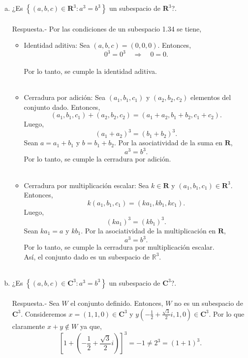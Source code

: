 \begin{enumerate}[\bfseries 1.]
\begin{enumerate}[(a)]
	    \item ¿Es $\left\{(a,b,c) \in \textbf{R}^3 : a^3=b^3 \right\}$ un subespacio de $\textbf{R}^3$?.\\\\
		Respuesta.-\; Por las condiciones de un subespacio 1.34 se tiene,\\
		\begin{itemize}
		    \item Identidad aditiva: Sea $(a,b,c)=(0,0,0)$. Entonces,
			$$0^3=0^3\quad \Rightarrow \quad 0=0.$$\\
			Por lo tanto, se cumple la identidad aditiva.\\\\
		    \item Cerradura por adición: Sea $(a_1,b_1,c_1)$ y $(a_2,b_2,c_2)$ elementos del conjunto dado. Entonces,
			$$(a_1,b_1,c_1)+(a_2,b_2,c_2)=(a_1+a_2,b_1+b_2,c_1+c_2).$$
			Luego,
			$$\left(a_1+a_2\right)^3=\left(b_1+b_2\right)^3.$$
			Sean $a=a_1+b_1$ y $b=b_1+b_2$. Por la asociatividad de la suma en $\textbf{R}$,
			$$a^3=b^3.$$
			Por lo tanto, se cumple la cerradura por adición.\\\\
		    \item Cerradura por multiplicación escalar: Sea $k\in \textbf{R}$ y $(a_1,b_1,c_1)\in \textbf{R}^3$. Entonces,
			$$k(a_1,b_1,c_1)=(ka_1,kb_1,kc_1).$$
			Luego,
			$$\left(ka_1\right)^3=\left(kb_1\right)^3.$$
			Sean $ka_1=a$ y $kb_1$. Por la asociatividad de la multiplicación en $\textbf{R}$,
			$$a^3=b^3.$$
			Por lo tanto, se cumple la cerradura por multiplicación escalar.\\
			Así, el conjunto dado es un subespacio de $\mathbb{R}^3$.\\\\
		\end{itemize}

	    \item ¿Es $\left\{(a,b,c)\in \textbf{C}^3 : a^3=b^3 \right\}$ un subespacio de $\textbf{C}^3$?.\\\\
		Respuesta.-\; Sea $W$ el conjunto definido. Entonces, $W$ no es un subespacio de $\textbf{C}^3$. Consideremos $x=(1,1,0)\in \textbf{C}^3$  y $y\left(-\frac{1}{2}+\frac{\sqrt{3}}{2}i,1,0\right)\in \textbf{C}^3$. Por lo que claramente $x+y\notin W$ ya que,
		$$\left[1+\left(-\dfrac{1}{2}+\dfrac{\sqrt{3}}{2}i\right)\right]^3=-1\neq 2^3=(1+1)^3.$$\\


\end{enumerate}
\end{enumerate}
